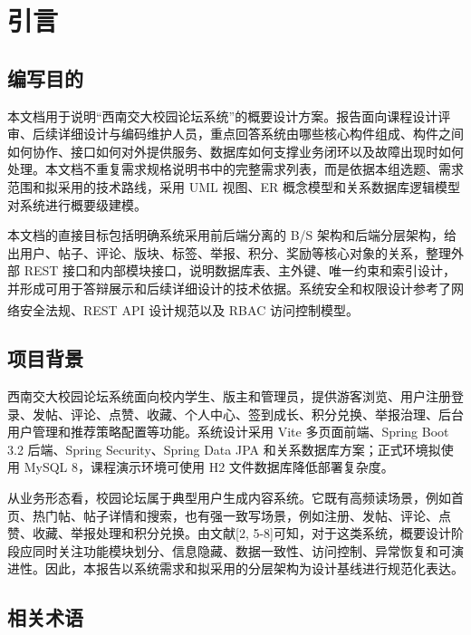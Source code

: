 \documentclass[UTF8,zihao=-4,a4paper]{ctexart}
\newcommand{\citeup}[1]{\textsuperscript{\fontsize{12pt}{20pt}\selectfont\rmfamily[#1]}}
\begin{document}
\tableofcontents
\clearpage

\section{引言}

\subsection{编写目的}

本文档用于说明“西南交大校园论坛系统”的概要设计方案。报告面向课程设计评审、后续详细设计与编码维护人员，重点回答系统由哪些核心构件组成、构件之间如何协作、接口如何对外提供服务、数据库如何支撑业务闭环以及故障出现时如何处理。本文档不重复需求规格说明书中的完整需求列表，而是依据本组选题、需求范围和拟采用的技术路线，采用 UML 视图、ER 概念模型和关系数据库逻辑模型对系统进行概要级建模。

本文档的直接目标包括明确系统采用前后端分离的 B/S 架构和后端分层架构，给出用户、帖子、评论、版块、标签、举报、积分、奖励等核心对象的关系，整理外部 REST 接口和内部模块接口，说明数据库表、主外键、唯一约束和索引设计，并形成可用于答辩展示和后续详细设计的技术依据。系统安全和权限设计参考了网络安全法规、REST API 设计规范以及 RBAC 访问控制模型\citeup{1,3,6}。

\subsection{项目背景}

西南交大校园论坛系统面向校内学生、版主和管理员，提供游客浏览、用户注册登录、发帖、评论、点赞、收藏、个人中心、签到成长、积分兑换、举报治理、后台用户管理和推荐策略配置等功能。系统设计采用 Vite 多页面前端、Spring Boot 3.2 后端、Spring Security、Spring Data JPA 和关系数据库方案；正式环境拟使用 MySQL 8，课程演示环境可使用 H2 文件数据库降低部署复杂度。

从业务形态看，校园论坛属于典型用户生成内容系统。它既有高频读场景，例如首页、热门帖、帖子详情和搜索，也有强一致写场景，例如注册、发帖、评论、点赞、收藏、举报处理和积分兑换。由文献[2, 5-8]可知，对于这类系统，概要设计阶段应同时关注功能模块划分、信息隐藏、数据一致性、访问控制、异常恢复和可演进性。因此，本报告以系统需求和拟采用的分层架构为设计基线进行规范化表达。

\subsection{相关术语}
\end{document}
